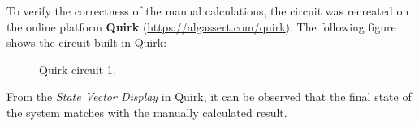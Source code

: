 To verify the correctness of the manual calculations, the circuit was recreated on the online platform \textbf{Quirk} (\url{https://algassert.com/quirk}).
The following figure shows the circuit built in Quirk:
\begin{figure}[h]

    \centering

    \caption{Quirk circuit 1.}
        \label{fig:quirk_1}
\end{figure}
From the \textit{State Vector Display} in Quirk, it can be observed that the final state of the system matches with the manually calculated result.
